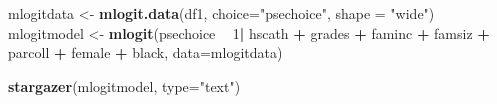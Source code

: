 \documentclass[
]{book}
\newenvironment{Shaded}{\begin{snugshade}}{\end{snugshade}}
\newcommand{\DataTypeTok}[1]{\textcolor[rgb]{0.13,0.29,0.53}{#1}}
\newcommand{\DecValTok}[1]{\textcolor[rgb]{0.00,0.00,0.81}{#1}}
\newcommand{\KeywordTok}[1]{\textcolor[rgb]{0.13,0.29,0.53}{\textbf{#1}}}
\newcommand{\NormalTok}[1]{#1}
\newcommand{\OperatorTok}[1]{\textcolor[rgb]{0.81,0.36,0.00}{\textbf{#1}}}
\newcommand{\StringTok}[1]{\textcolor[rgb]{0.31,0.60,0.02}{#1}}
\begin{document}
\begin{Shaded}
\begin{Highlighting}[]
\NormalTok{mlogitdata <-}\StringTok{ }\KeywordTok{mlogit.data}\NormalTok{(df1, }\DataTypeTok{choice=}\StringTok{"psechoice"}\NormalTok{, }\DataTypeTok{shape =} \StringTok{"wide"}\NormalTok{)}
\NormalTok{mlogitmodel <-}\StringTok{ }\KeywordTok{mlogit}\NormalTok{(psechoice }\OperatorTok{~}\StringTok{ }\DecValTok{1}\OperatorTok{|}\StringTok{ }\NormalTok{hscath }\OperatorTok{+}\StringTok{ }\NormalTok{grades }\OperatorTok{+}\StringTok{ }\NormalTok{faminc }\OperatorTok{+}\StringTok{ }\NormalTok{famsiz }\OperatorTok{+}\StringTok{ }\NormalTok{parcoll }\OperatorTok{+}\StringTok{ }\NormalTok{female }\OperatorTok{+}\StringTok{ }\NormalTok{black, }\DataTypeTok{data=}\NormalTok{mlogitdata)}

\KeywordTok{stargazer}\NormalTok{(mlogitmodel, }\DataTypeTok{type=}\StringTok{"text"}\NormalTok{)}
\end{Highlighting}
\end{Shaded}
\end{document}
